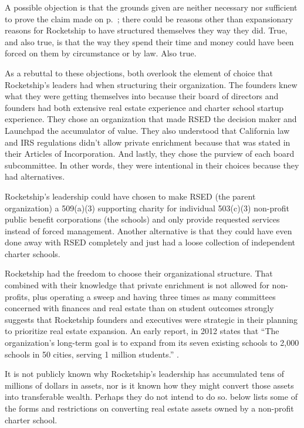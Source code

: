 A possible objection is that the grounds given are neither necessary nor sufficient to prove the claim made on p.~\pageref{p:claim}; there could be reasons other than expansionary reasons for Rocketship to have structured themselves they way they did. True, and also true, is that the way they spend their time and money could have been forced on them by circumstance or by law. Also true.

As a rebuttal to these objections, both overlook the element of choice that Rocketship's leaders had when structuring their organization. The founders knew what they were getting themselves into because their board of directors and founders had both extensive real estate experience and charter school startup experience. They chose an organization that made RSED the decision maker and Launchpad the accumulator of value. They also understood that California law and IRS regulations didn't allow private enrichment because that was stated in their Articles of Incorporation. And lastly, they chose the purview of each board subcommittee. In other words, they were intentional in their choices because they had alternatives.

Rocketship's leadership could have chosen to make RSED (the parent organization) a 509(a)(3) supporting charity for individual 503(c)(3) non-profit public benefit corporations (the schools) and only provide requested services instead of forced management. Another alternative is that they could have even done away with RSED completely and just had a loose collection of independent charter schools. 

Rocketship had the freedom to choose their organizational structure. That combined with their knowledge that private enrichment is not allowed for non-profits, plus operating a sweep and having three times as many committees concerned with finances and real estate than on student outcomes strongly suggests that Rocketship founders and executives were strategic in their planning to prioritize real estate expansion. An early report,  in 2012 states that ``The organization’s long-term goal is to expand from its seven existing schools to 2,000 schools in 50 cities, serving 1 million students.'' \parencite[3]{Carlisle.Kovalkoski2012}.

It is not publicly known why Rocketship's leadership has accumulated tens of millions of dollars in assets, nor is it known how they might convert those assets into transferable wealth. Perhaps they do not intend to do so.  below lists some of the forms and restrictions on converting real estate assets owned by a non-profit charter school.

